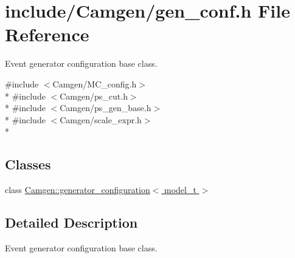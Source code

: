 \hypertarget{a00631}{\section{include/\-Camgen/gen\-\_\-conf.h File Reference}
\label{a00631}
}


Event generator configuration base class.  


{\ttfamily \#include $<$Camgen/\-M\-C\-\_\-config.\-h$>$}\\*
{\ttfamily \#include $<$Camgen/ps\-\_\-cut.\-h$>$}\\*
{\ttfamily \#include $<$Camgen/ps\-\_\-gen\-\_\-base.\-h$>$}\\*
{\ttfamily \#include $<$Camgen/scale\-\_\-expr.\-h$>$}\\*
\subsection*{Classes}
\begin{DoxyCompactItemize}
\item 
class \hyperlink{a00237}{Camgen\-::generator\-\_\-configuration$<$ model\-\_\-t $>$}
\end{DoxyCompactItemize}


\subsection{Detailed Description}
Event generator configuration base class. 